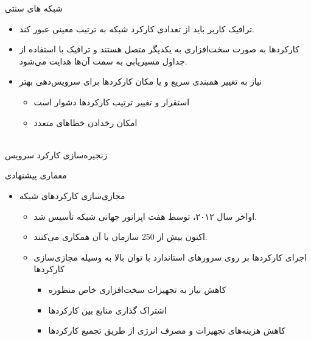 \documentclass[dvipsnames]{beamer}
\makeatletter
\newcommand{\RTList}{\raggedleft\rightskip\@totalleftmargin}
\makeatother
\begin{document}
\begin{persian}
	\begin{frame}{شبکه های سنتی}
		\begin{itemize}\RTList{}
			\justifying
			\item ترافیک کاربر باید از تعدادی کارکرد شبکه به ترتیب معینی عبور کند.
			\item کارکردها به صورت سخت‌افزاری به یکدیگر متصل هستند و ترافیک با استفاده از جداول مسیریابی به سمت آن‌ها هدایت می‌شود.
			\item نیاز به تغییر همبندی سریع و یا مکان کارکردها برای سرویس‌دهی بهتر
						\begin{itemize}\RTList{}
							\item استقرار و تغییر ترتیب کارکردها دشوار است
							\item امکان رخدادن خطاهای متعدد
						\end{itemize}
		\end{itemize}
		\begin{block}{}
			\centering
			\\
			زنجیره‌سازی کارکرد سرویس
		\end{block}
	\end{frame}

	\begin{frame}{معماری پیشنهادی}
		\begin{itemize}\RTList{}
			\justifying
			\item مجازی‌سازی کارکردهای شبکه
						\begin{itemize}\RTList{}
							\item اواخر سال ۲۰۱۲،  توسط هفت اپراتور جهانی شبکه تأسیس شد.
							\item اکنون بیش از 250 سازمان با آن همکاری می‌کنند.
							\item اجرای کارکردها بر روی سرورهای استاندارد با توان بالا به وسیله مجازی‌سازی کارکردها
										\begin{itemize}\RTList{}
											\item کاهش نیاز به تجهیزات سخت‌افزاری خاص منظوره
											\item اشتراک گذاری منابع بین کارکرد‌ها
											\item کاهش هزینه‌های تجهیزات و مصرف انرژی از طریق تجمیع کارکردها
										\end{itemize}
						\end{itemize}
		\end{itemize}
	\end{frame}


\end{persian}
\end{document}

